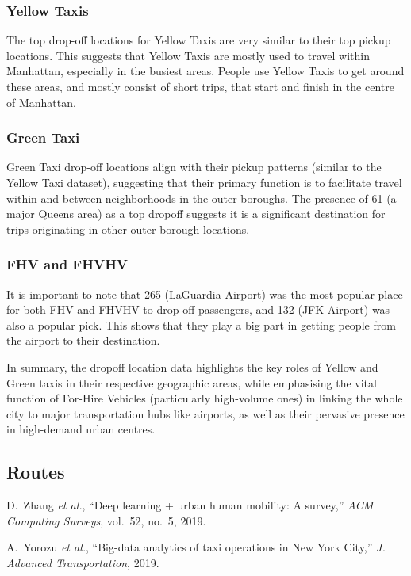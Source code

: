 \documentclass[conference]{IEEEtran}
\begin{document}
\subsubsection*{Yellow Taxis} The top drop-off locations for Yellow Taxis are very similar to their top pickup locations.
This suggests that Yellow Taxis are mostly used to travel within Manhattan, especially in the busiest areas. People use
Yellow Taxis to get around these areas, and mostly consist of short trips, that start and finish in the centre of Manhattan.

\subsubsection*{Green Taxi} Green Taxi drop-off locations align with their pickup patterns (similar to the Yellow Taxi
dataset), suggesting that their primary function is to facilitate travel within and between neighborhoods in the outer
boroughs. The presence of 61 (a major Queens area) as a top dropoff suggests it is a significant destination for trips
originating in other outer borough locations.

\subsubsection*{FHV and FHVHV} It is important to note that 265 (LaGuardia Airport) was the most popular place for both
FHV and FHVHV to drop off passengers, and 132 (JFK Airport) was also a popular pick. This shows that they play a big
part in getting people from the airport to their destination.

In summary, the dropoff location data highlights the key roles of Yellow and Green taxis in their respective geographic
areas, while emphasising the vital function of For-Hire Vehicles (particularly high-volume ones) in linking the whole
city to major transportation hubs like airports, as well as their pervasive presence in high-demand urban centres.

\subsection{Routes}


\begin{thebibliography}{00}

  D.~Zhang \emph{et al.}, “Deep learning + urban human mobility: A survey,”
  \emph{ACM Computing Surveys}, vol.~52, no.~5, 2019.

  A.~Yorozu \emph{et al.}, “Big-data analytics of taxi operations in New York
  City,” \emph{J. Advanced Transportation}, 2019.


\end{thebibliography}
\end{document}

